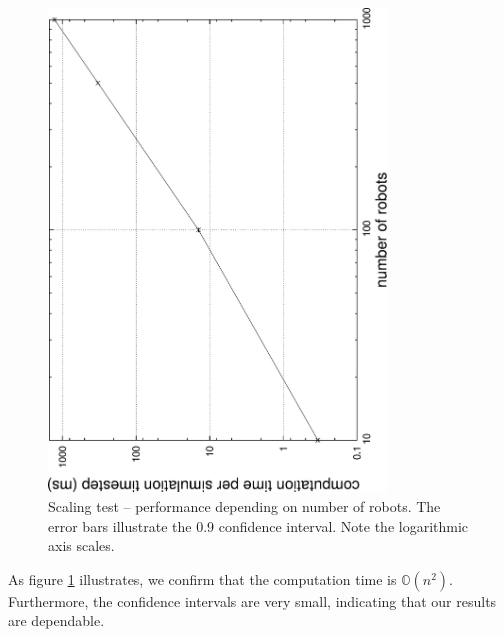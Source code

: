\begin{figure}[p]
	\begin{center}
	\includegraphics[width=0.8\textwidth]{scaling-rminrect}
	\caption{Scaling test -- performance depending on number of robots. The error bars illustrate the 0.9 confidence interval. Note the logarithmic axis scales.}
	\label{pic:scaling:rminrect}
	\end{center}
\end{figure}

As figure \ref{pic:scaling:rminrect} illustrates, we confirm that the computation time is $\mathbb{O}(n^2)$. Furthermore, the confidence intervals are very small, indicating that our results are dependable.